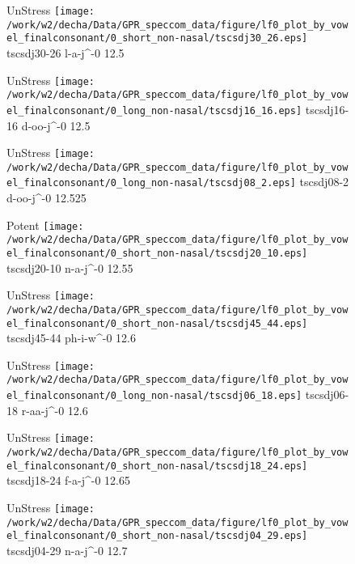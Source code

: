 \documentclass{article}
\begin{document}
\begin{figure}[t]
\begin{minipage}[b]{.24\textwidth}
UnStress
\centering
\texttt{[image: /work/w2/decha/Data/GPR\_speccom\_data/figure/lf0\_plot\_by\_vowel\_finalconsonant/0\_short\_non-nasal/tscsdj30\_26.eps]}
tscsdj30-26 l-a-j\textasciicircum-0 12.5
\end{minipage}
\begin{minipage}[b]{.24\textwidth}
UnStress
\centering
\texttt{[image: /work/w2/decha/Data/GPR\_speccom\_data/figure/lf0\_plot\_by\_vowel\_finalconsonant/0\_long\_non-nasal/tscsdj16\_16.eps]}
tscsdj16-16 d-oo-j\textasciicircum-0 12.5
\end{minipage}
\begin{minipage}[b]{.24\textwidth}
UnStress
\centering
\texttt{[image: /work/w2/decha/Data/GPR\_speccom\_data/figure/lf0\_plot\_by\_vowel\_finalconsonant/0\_long\_non-nasal/tscsdj08\_2.eps]}
tscsdj08-2 d-oo-j\textasciicircum-0 12.525
\end{minipage}
\begin{minipage}[b]{.24\textwidth}
\colorbox{Apricot}{Potent}
\centering
\texttt{[image: /work/w2/decha/Data/GPR\_speccom\_data/figure/lf0\_plot\_by\_vowel\_finalconsonant/0\_short\_non-nasal/tscsdj20\_10.eps]}
tscsdj20-10 n-a-j\textasciicircum-0 12.55
\end{minipage}
\end{figure}
\clearpage
\begin{figure}[t]
\begin{minipage}[b]{.24\textwidth}
UnStress
\centering
\texttt{[image: /work/w2/decha/Data/GPR\_speccom\_data/figure/lf0\_plot\_by\_vowel\_finalconsonant/0\_short\_non-nasal/tscsdj45\_44.eps]}
tscsdj45-44 ph-i-w\textasciicircum-0 12.6
\end{minipage}
\begin{minipage}[b]{.24\textwidth}
UnStress
\centering
\texttt{[image: /work/w2/decha/Data/GPR\_speccom\_data/figure/lf0\_plot\_by\_vowel\_finalconsonant/0\_long\_non-nasal/tscsdj06\_18.eps]}
tscsdj06-18 r-aa-j\textasciicircum-0 12.6
\end{minipage}
\begin{minipage}[b]{.24\textwidth}
UnStress
\centering
\texttt{[image: /work/w2/decha/Data/GPR\_speccom\_data/figure/lf0\_plot\_by\_vowel\_finalconsonant/0\_short\_non-nasal/tscsdj18\_24.eps]}
tscsdj18-24 f-a-j\textasciicircum-0 12.65
\end{minipage}
\begin{minipage}[b]{.24\textwidth}
UnStress
\centering
\texttt{[image: /work/w2/decha/Data/GPR\_speccom\_data/figure/lf0\_plot\_by\_vowel\_finalconsonant/0\_short\_non-nasal/tscsdj04\_29.eps]}
tscsdj04-29 n-a-j\textasciicircum-0 12.7
\end{minipage}
\end{figure}
\end{document}
